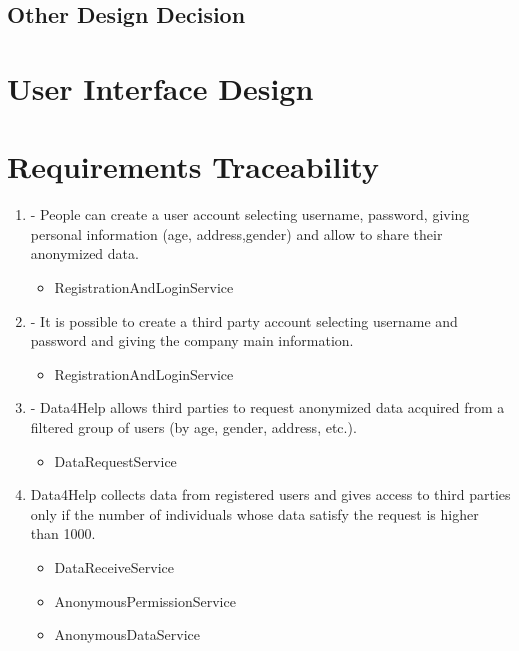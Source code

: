 \documentclass[a4paper]{article}
\begin{document}
\subsection{Other Design Decision}

\section{User Interface Design}

\section{Requirements Traceability}

\begin{enumerate}[label*=\bf{R.\arabic*}]

\item - People can create a user account selecting username, password,
giving personal information (age, address,gender) and allow to
share their anonymized data.

\begin{itemize}
\item RegistrationAndLoginService
\end{itemize}

\item - It is possible to create a third party account selecting username
and password and giving the company main information.

\begin{itemize}
\item RegistrationAndLoginService
\end{itemize}

\item - Data4Help allows third parties to request anonymized data acquired
from a filtered group of users (by age, gender, address, etc.).

\begin{itemize}
\item DataRequestService
\end{itemize}

\item Data4Help collects data from registered users and gives access to
third parties only if the number of individuals whose data satisfy the
request is higher than 1000.

\begin{itemize}
\item DataReceiveService
\item AnonymousPermissionService
\item AnonymousDataService
\end{itemize}


\end{enumerate}
\end{document}
